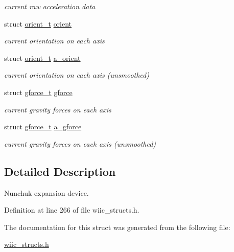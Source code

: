 \begin{DoxyCompactItemize}
\begin{DoxyCompactList}\small\item\em current raw acceleration data \end{DoxyCompactList}\item 
\hypertarget{structnunchuk__t_a24ca076b817418f2e2c1507965256b45}{struct \hyperlink{structorient__t}{orient\-\_\-t} \hyperlink{structnunchuk__t_a24ca076b817418f2e2c1507965256b45}{orient}}\label{structnunchuk__t_a24ca076b817418f2e2c1507965256b45}

\begin{DoxyCompactList}\small\item\em current orientation on each axis \end{DoxyCompactList}\item 
\hypertarget{structnunchuk__t_a6efb9dfa3391cb3815d6a1741cb4525b}{struct \hyperlink{structorient__t}{orient\-\_\-t} \hyperlink{structnunchuk__t_a6efb9dfa3391cb3815d6a1741cb4525b}{a\-\_\-orient}}\label{structnunchuk__t_a6efb9dfa3391cb3815d6a1741cb4525b}

\begin{DoxyCompactList}\small\item\em current orientation on each axis (unsmoothed) \end{DoxyCompactList}\item 
\hypertarget{structnunchuk__t_a79d598a365f147ca23c67e592776fde0}{struct \hyperlink{structgforce__t}{gforce\-\_\-t} \hyperlink{structnunchuk__t_a79d598a365f147ca23c67e592776fde0}{gforce}}\label{structnunchuk__t_a79d598a365f147ca23c67e592776fde0}

\begin{DoxyCompactList}\small\item\em current gravity forces on each axis \end{DoxyCompactList}\item 
\hypertarget{structnunchuk__t_a50d07c79c66f167b7fdb7ee56f173516}{struct \hyperlink{structgforce__t}{gforce\-\_\-t} \hyperlink{structnunchuk__t_a50d07c79c66f167b7fdb7ee56f173516}{a\-\_\-gforce}}\label{structnunchuk__t_a50d07c79c66f167b7fdb7ee56f173516}

\begin{DoxyCompactList}\small\item\em current gravity forces on each axis (unsmoothed) \end{DoxyCompactList}\end{DoxyCompactItemize}


\subsection{\-Detailed \-Description}
\-Nunchuk expansion device. 

\-Definition at line 266 of file wiic\-\_\-structs.\-h.



\-The documentation for this struct was generated from the following file\-:\begin{DoxyCompactItemize}
\item 
\hyperlink{wiic__structs_8h}{wiic\-\_\-structs.\-h}\end{DoxyCompactItemize}
